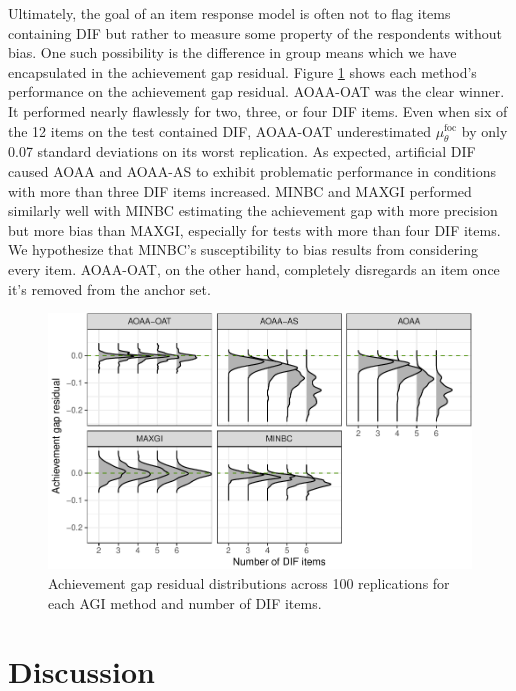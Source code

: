 \documentclass[
  english,
  man,floatsintext]{apa6}
\begin{document}
Ultimately, the goal of an item response model is often not to flag items containing DIF but rather to measure some property of the respondents without bias. One such possibility is the difference in group means which we have encapsulated in the achievement gap residual. Figure \ref{fig:achievegap} shows each method's performance on the achievement gap residual. AOAA-OAT was the clear winner. It performed nearly flawlessly for two, three, or four DIF items. Even when six of the 12 items on the test contained DIF, AOAA-OAT underestimated \(\mu_\theta^\text{foc}\) by only 0.07 standard deviations on its worst replication. As expected, artificial DIF caused AOAA and AOAA-AS to exhibit problematic performance in conditions with more than three DIF items increased. MINBC and MAXGI performed similarly well with MINBC estimating the achievement gap with more precision but more bias than MAXGI, especially for tests with more than four DIF items. We hypothesize that MINBC's susceptibility to bias results from considering every item. AOAA-OAT, on the other hand, completely disregards an item once it's removed from the anchor set.

\begin{figure}[h]

{\centering \includegraphics{paper_apa_files/figure-latex/achievegap-1} 

}

\caption{Achievement gap residual distributions across 100 replications for each AGI method and number of DIF items.}\label{fig:achievegap}
\end{figure}

\hypertarget{discussion}{%
\section{Discussion}\label{discussion}}
\end{document}
